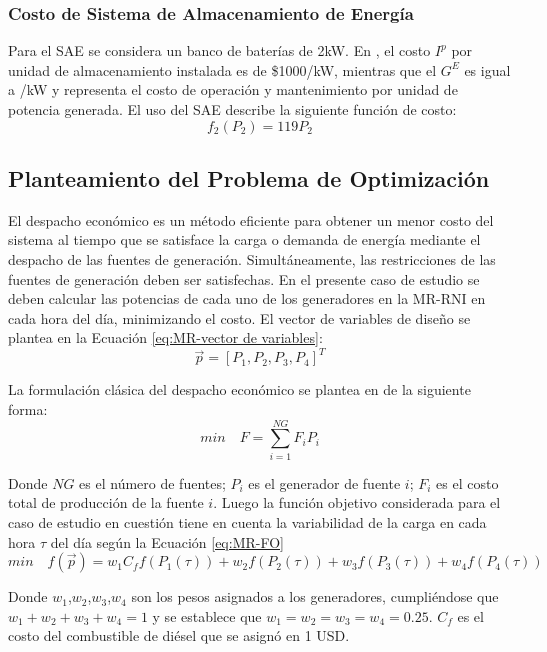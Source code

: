 \subsubsection{Costo de Sistema de Almacenamiento de Energía}
Para el SAE se considera un banco de baterías de 2kW. En \cite{zapata_zapata_control_2017}, el costo $I^p$ por unidad de almacenamiento instalada es de \$1000/kW, mientras que el $G^E$ es igual a /kW y representa el costo de operación y mantenimiento por unidad de potencia generada. El uso del SAE describe la siguiente función de costo:
\begin{equation}\label{eq:ESS}
f_2(P_2) = 119P_2
\end{equation}
\subsection{Planteamiento del Problema de Optimización}
El despacho económico es un método eficiente para obtener un menor costo del sistema al tiempo que se satisface la carga o demanda de energía mediante el despacho de las fuentes de generación. Simultáneamente, las restricciones de las fuentes de generación deben ser satisfechas. En el presente caso de estudio se deben calcular las potencias de cada uno de los generadores en la MR-RNI en cada hora del día, minimizando el costo. El vector de variables de diseño se plantea en la Ecuación  \ref{eq:MR-vector de variables}:
 \begin{equation}\label{eq:MR-vector de variables}
  \vec{p}=\left[ P_1,P_2,P_3,P_4 \right]^T
 \end{equation}


La formulación clásica del despacho económico se plantea en \cite{Ramabhotla_Economic_dispatch} de la siguiente forma:
 \begin{equation}
 min\quad  F=
 \sum_{i=1}^{NG}F_{i}P_{i} 
 \end{equation}

Donde $NG$ es el número de fuentes; $P_{i}$ es el generador de fuente $i$; $F_{i}$ es el costo total de producción de la fuente $i$. Luego la función objetivo considerada para el caso de estudio en cuestión tiene en cuenta la variabilidad de la carga en cada hora  $\tau$ del día según la Ecuación \ref{eq:MR-FO}
 \begin{equation}\label{eq:MR-FO}
min \quad f(\vec{p} ) = w_1C_f f(P_1(\tau)) + w_2f(P_2(\tau)) + w_3f(P_3(\tau))+ w_4f(P_4(\tau))
 \end{equation}
 
Donde $w_1$,$w_2$,$w_3$,$w_4$ son los pesos asignados a los generadores, cumpliéndose que  $w_1+ w_2+w_3+w_4=1$ y  se establece que $w_1=w_2=w_3=w_4=0.25$. $C_f$ es el costo del combustible de diésel que se asignó en 1 USD.


